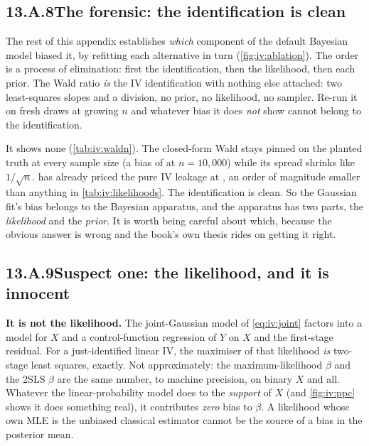 \subsection*{13.A.8\quad The forensic: the identification is clean}



The rest of this appendix establishes \emph{which} component of the default Bayesian model biased it,
by refitting each alternative in turn (\cref{fig:iv:ablation}). The order is a process of
elimination: first the identification, then the likelihood, then each prior. The Wald ratio \emph{is}
the IV identification with nothing else attached: two least-squares slopes and a division, no prior,
no likelihood, no sampler. Re-run it on fresh draws at growing $n$ and whatever bias it does
\emph{not} show cannot belong to the identification.



It shows none (\cref{tab:iv:waldn}). The closed-form Wald stays pinned on the planted truth at
every sample size (a bias of \eur{\nbElevenWaldBiasBig} at $n = 10{,}000$) while its spread
shrinks like $1/\sqrt{n}$.  has already priced the pure IV leakage at
\eur{\nbElevenFLeak}, an order of magnitude smaller than anything in \cref{tab:iv:likelihoods}. The
identification is clean. So the Gaussian fit's bias belongs to the Bayesian apparatus, and the
apparatus has two parts, the \emph{likelihood} and the \emph{prior}. It is worth being careful
about which, because the obvious answer is wrong and the book's own thesis rides on getting it right.

\subsection*{13.A.9\quad Suspect one: the likelihood, and it is innocent}

\textbf{It is not the likelihood.} The joint-Gaussian model of \cref{eq:iv:joint} factors into a
model for $X$ and a control-function regression of $Y$ on $X$ and the first-stage residual. For
a just-identified linear IV, the maximiser of that likelihood \emph{is} two-stage least squares,
exactly. Not approximately: the maximum-likelihood $\beta$ and the 2SLS $\beta$ are the same number,
to machine precision, on binary $X$ and all. Whatever the linear-probability model does to the
\emph{support} of $X$ (and \cref{fig:iv:ppc} shows it does something real), it contributes
\emph{zero} bias to $\beta$. A likelihood whose own MLE is the unbiased classical estimator cannot be
the source of a bias in the posterior mean.

